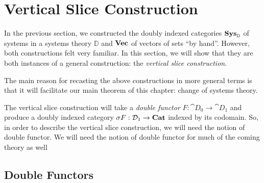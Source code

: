 \documentclass[DynamicalBook]{subfiles}
\begin{document}
  \section{Vertical Slice Construction}\label{sec.vertical_slice}

  In the previous section, we constructed the doubly indexed categories
  $\textbf{Sys}_{\mathbb{D}}$ of systems in a systems theory $\mathbb{D}$ and $\textbf{Vec}$
  of vectors of sets ``by hand''. However, both constructions felt very
  familiar. In this section, we will show that they are both instances of a
  general construction: the \emph{vertical slice construction}.

The main reason for recasting the above constructions in more general terms is
that it will facilitate our main theorem of this chapter: change of systems theory.

  The vertical slice construction will take a \emph{double functor} $F :
  \cat{D}_0 \to \cat{D}_1$ and produce a doubly indexed category $\sigma F :
  \mathcal{D}_1 \to \textbf{Cat}$ indexed by its codomain. So, in order to describe the
  vertical slice construction, we will need the notion of double functor. We will need the notion of double functor for much of the coming theory as well
  


\subsection{Double Functors}
  
\end{document}
